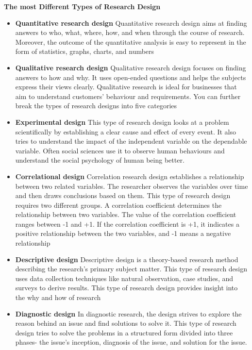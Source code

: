 \documentclass[conference]{IEEEtran}
\begin{document}
 \textbf{The most Different Types of Research Design}
\begin{itemize}

	\item \textbf{Quantitative research design}
	Quantitative research design aims at finding answers to who, what, where, how, and when through the course of research. Moreover, the outcome of the quantitative analysis is easy to represent in the form of statistics, graphs, charts, and numbers
	\item \textbf{Qualitative research design}
	Qualitative research design focuses on finding answers to how and why. It uses open-ended questions and helps the subjects express their views clearly.
	Qualitative research is ideal for businesses that aim to understand customers’ behaviour and requirements.
	You can further break the types of research designs into five categories
	\item \textbf{Experimental design}
	This type of research design looks at a problem scientifically by establishing a clear cause and effect of every event. It also tries to understand the impact of the independent variable on the dependable variable.
	Often social sciences use it to observe human behaviours and understand the social psychology of human being better.
	\item \textbf{Correlational design}
	Correlation research design establishes a relationship between two related variables. The researcher observes the variables over time and then draws conclusions based on them. This type of research design requires two different groups.
	A correlation coefficient determines the relationship between two variables. The value of the correlation coefficient ranges between -1 and +1. If the correlation coefficient is +1, it indicates a positive relationship between the two variables, and -1 means a negative relationship
		\item \textbf{Descriptive design}
		Descriptive design is a theory-based research method describing the research’s primary subject matter. This type of research design uses data collection techniques like natural observation, case studies, and surveys to derive results.
		This type of research design provides insight into the why and how of research
			\item \textbf{Diagnostic design}
			In diagnostic research, the design strives to explore the reason behind an issue and find solutions to solve it. This type of research design tries to solve the problems in a structured form divided into three phases- the issue’s inception, diagnosis of the issue, and solution for the issue.

\end{itemize}
\end{document}
